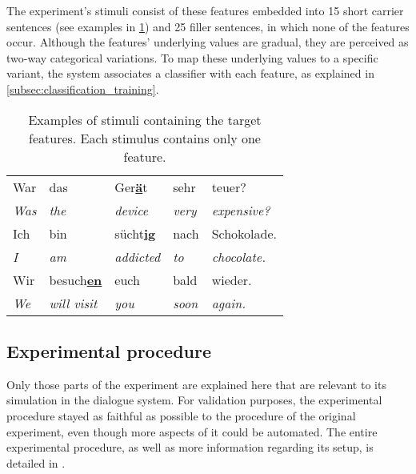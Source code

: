 The experiment's stimuli consist of these features embedded into 15 short carrier sentences (see examples in \cref{tab:target_features}) and 25 filler sentences, in which none of the features occur.
Although the features' underlying values are gradual, they are perceived as two-way categorical variations.
To map these underlying values to a specific variant, the system associates a classifier with each feature, as explained in \cref{subsec:classification_training}.

\begin{table}[t]
	\centering
	\begin{tabularx}{\linewidth}{@{}*{5}{l}}
		\toprule
		
		War          	& das          			& Ger\textbf{\underline{ä}}t	& sehr          	& teuer? \\
		\emph{Was} 		& \emph{the} 			& \emph{device}           		& \emph{very} 		& \emph{expensive?} \\[0.1cm]
		
		Ich          	& bin         			& sücht\textbf{\underline{ig}}	& nach				& Schokolade. \\
		\emph{I}   		& \emph{am} 			& \emph{addicted}				& \emph{to} 		& \emph{chocolate.} \\[0.1cm]
		
		Wir         	& besuch\textbf{\underline{en}} 						& euch				& bald          & wieder. \\
		\emph{We} 		& \emph{will visit}		& \emph{you} 					& \emph{soon} 		& \emph{again.} \\
		
		\bottomrule
	\end{tabularx}
	\caption[Example sentence for selected phonetic features]{Examples of stimuli containing the target features. Each stimulus contains only one feature.}
	\label{tab:target_features}
\end{table}

\subsection{Experimental procedure}
\label{subsec:experimental_procedure}

Only those parts of the experiment are explained here that are relevant to its simulation in the dialogue system.
For validation purposes, the experimental procedure stayed as faithful as possible to the procedure of the original experiment, even though more aspects of it could be automated.
The entire experimental procedure, as well as more information regarding its setup, is detailed in \citet{Gessinger2017Interspeech}.

